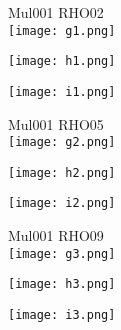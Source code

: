\documentclass[a4paper]{article}
\begin{document}
    \begin{figure}[tb]
    Mul001 RHO02 \\
    \texttt{[image: g1.png]}
        \begin{minipage}{0.48\textwidth}
            \def\svgwidth{\columnwidth}
            \texttt{[image: h1.png]}
        \end{minipage}
        \hspace{4em}
        \begin{minipage}{0.48\textwidth}
            \def\svgwidth{\columnwidth}
            \texttt{[image: i1.png]}
        \end{minipage}
    \end{figure}
    \newpage
    \begin{figure}[tb]
    Mul001 RHO05 \\
    \texttt{[image: g2.png]}
        \begin{minipage}{0.48\textwidth}
            \def\svgwidth{\columnwidth}
            \texttt{[image: h2.png]}
        \end{minipage}
        \hspace{4em}
        \begin{minipage}{0.48\textwidth}
            \def\svgwidth{\columnwidth}
            \texttt{[image: i2.png]}
        \end{minipage}
    \end{figure}
    \newpage
    
    \begin{figure}[tb]
        Mul001 RHO09 \\
    \texttt{[image: g3.png]}
        \begin{minipage}{0.48\textwidth}
            \def\svgwidth{\columnwidth}
            \texttt{[image: h3.png]}
        \end{minipage}
        \hspace{4em}
        \begin{minipage}{0.48\textwidth}
            \def\svgwidth{\columnwidth}
            \texttt{[image: i3.png]}
        \end{minipage}
    \end{figure}
    
\end{document}
